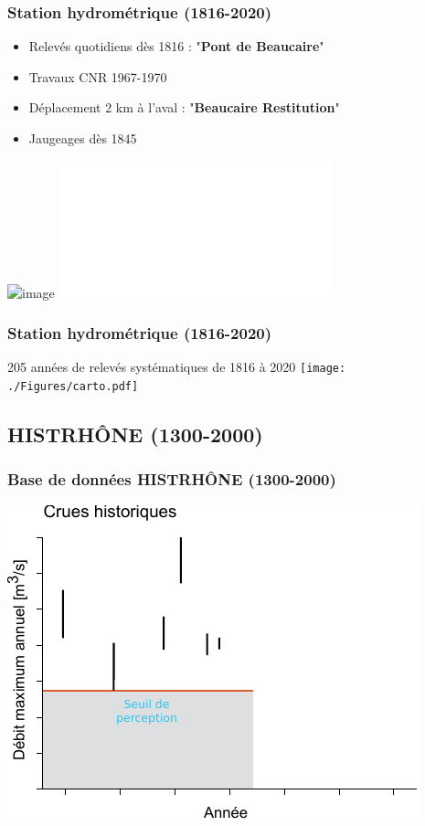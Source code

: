 \documentclass[compress,9pt]{beamer}
\begin{document}
	\begin{frame}%
		\frametitle{Station hydrométrique (1816-2020)}
		\begin{minipage}{.45\textwidth}
			\begin{itemize}
				\item<1->[$\vartriangleright$] Relevés quotidiens dès 1816 : "\textbf{Pont de Beaucaire}"
				\vspace{2pt}
				\item<2->[$\vartriangleright$] Travaux CNR 1967-1970
				\vspace{2pt}
				\item<3->[$\vartriangleright$] Déplacement 2 km à l'aval : "\textbf{Beaucaire Restitution}"
				\vspace{2pt}
				\item<5->[$\vartriangleright$] Jaugeages dès 1845
			\end{itemize}
		\end{minipage}
		\begin{minipage}{.53\textwidth}
			\begin{center}
	      		\includegraphics<1>[width = \columnwidth]{./Figures/TabObs.jpg} 
	      		\includegraphics<5>[width = \textwidth]{./Figures/Jaus.pdf}
			\end{center}
		\end{minipage}
	\end{frame}
	
	\begin{frame}%
		\frametitle{Station hydrométrique (1816-2020)}
		205 années de relevés systématiques de 1816 à 2020
		\vfill
		\texttt{[image: ./Figures/carto.pdf]} 
	\end{frame}
	
 	\subsection{HISTRHÔNE (1300-2000)}
	\begin{frame}%
		\frametitle{Base de données HISTRHÔNE (1300-2000)}
		\centering
      	\includegraphics[width = .8\textwidth]{./Figures/HistoFloods2.pdf}
	\end{frame}	 	
 	
\end{document}

